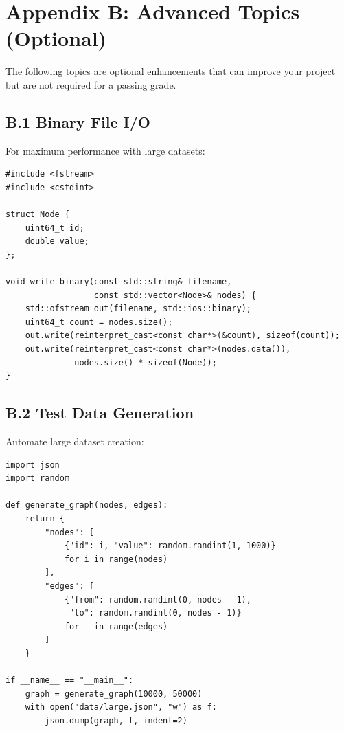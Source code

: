 
\section*{Appendix B: Advanced Topics (Optional)}

The following topics are optional enhancements that can improve your project but are not required for a passing grade.

\subsection*{B.1 Binary File I/O}

For maximum performance with large datasets:

\begin{lstlisting}[style=cpp]
#include <fstream>
#include <cstdint>

struct Node {
    uint64_t id;
    double value;
};

void write_binary(const std::string& filename,
                  const std::vector<Node>& nodes) {
    std::ofstream out(filename, std::ios::binary);
    uint64_t count = nodes.size();
    out.write(reinterpret_cast<const char*>(&count), sizeof(count));
    out.write(reinterpret_cast<const char*>(nodes.data()),
              nodes.size() * sizeof(Node));
}
\end{lstlisting}

\subsection*{B.2 Test Data Generation}

Automate large dataset creation:

\begin{lstlisting}[style=python]
import json
import random

def generate_graph(nodes, edges):
    return {
        "nodes": [
            {"id": i, "value": random.randint(1, 1000)}
            for i in range(nodes)
        ],
        "edges": [
            {"from": random.randint(0, nodes - 1),
             "to": random.randint(0, nodes - 1)}
            for _ in range(edges)
        ]
    }

if __name__ == "__main__":
    graph = generate_graph(10000, 50000)
    with open("data/large.json", "w") as f:
        json.dump(graph, f, indent=2)
\end{lstlisting}

